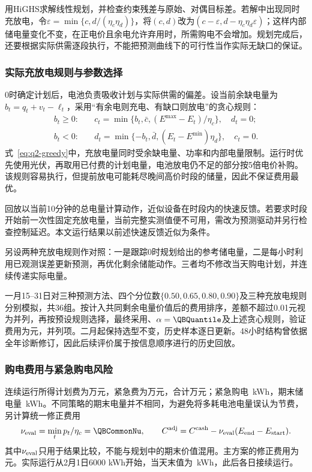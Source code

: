 用HiGHS求解线性规划，并检查约束残差与原始、对偶目标差\cite{scipy-linprog}。若解中出现同时充放电，令$\varepsilon=\min\{c,d/(\eta_c\eta_d)\}$，将$(c,d)$改为$(c-\varepsilon,d-\eta_c\eta_d\varepsilon)$；这样内部储电量变化不变，在正电价且余电允许弃用时，所需购电不会增加。规划完成后，还要根据实际供需逐段执行，不能把预测曲线下的可行性当作实际无缺口的保证。

\subsubsection{实际充放电规则与参数选择}

0时确定计划后，电池负责吸收计划与实际供需的偏差。设当前余缺电量为$b_t=q_t+v_t-\ell_t$，采用“有余电则充电、有缺口则放电”的贪心规则：
\begin{equation}
\begin{aligned}
 b_t\ge0:&\quad c_t=\min\{b_t,\bar c,(E^{\max}-E_t)/\eta_c\},\quad d_t=0;\\
 b_t<0:&\quad d_t=\min\{-b_t,\bar d,(E_t-E^{\min})\eta_d\},\quad c_t=0.
\end{aligned}
\label{eq:q2-greedy}
\end{equation}
式~\eqref{eq:q2-greedy}中，充放电量同时受余缺电量、功率和内部电量限制。运行时优先使用光伏，再取用已付费的计划电量，电池放电仍不足的部分按5倍电价补购。该规则容易执行，但提前放电可能耗尽晚间高价时段的储量，因此不保证费用最优。\par 回放以当前10分钟的总电量计算动作，近似设备在时段内的快速反馈。若要求时段开始前一次性固定充放电量，当前完整实测值便不可用，需改为预测驱动并另行检查控制延迟。本文运行结果以前述快速反馈近似为条件。

另设两种充放电规则作对照：一是跟踪0时规划给出的参考储电量，二是每小时利用已观测误差更新预测，再优化剩余储能动作。三者均不修改当天购电计划，并连续传递实际电量。

一月15--31日对三种预测方法、四个分位数$\{0.50,0.65,0.80,0.90\}$及三种充放电规则分别模拟，共36组。按计入共同剩余电量价值后的费用排序，差额不超过0.01元视为并列，再按预设规则选择，最终采用\QBForecast、$\alpha=\QBQuantile$及上述贪心规则，验证费用为\QBValidation 元，并列\QBTies 项。二月起保持选型不变，历史样本逐日更新。48小时结构曾依据全年诊断修订，因此后续评价属于按信息顺序进行的历史回放。

\subsubsection{购电费用与紧急购电风险}

连续运行所得计划费为\QTwoPlanCost 万元，紧急费为\QTwoEmergencyCost 万元，合计\QTwoTotalCost 万元；紧急购电\QTwoEmergencyEnergy\ kWh，期末储电量\QTwoTerminal\ kWh。不同策略的期末电量并不相同，为避免将多耗电池电量误认为节费，另计算统一修正费用
\begin{equation}
 \nu_{\rm eval}=\min_t p_t/\eta_c=\QBCommonNu,\qquad
 C^{\rm adj}=C^{\rm cash}-\nu_{\rm eval}(E_{\rm end}-E_{\rm start}).
\end{equation}
其中$\nu_{\rm eval}$只用于结果比较，不能与规划中的期末价值混用。主方案的修正费用为\QBAdjusted 元。实际运行从2月1日6000 kWh开始，当天末值为\QBFirstEnd\ kWh，此后各日接续运行。

